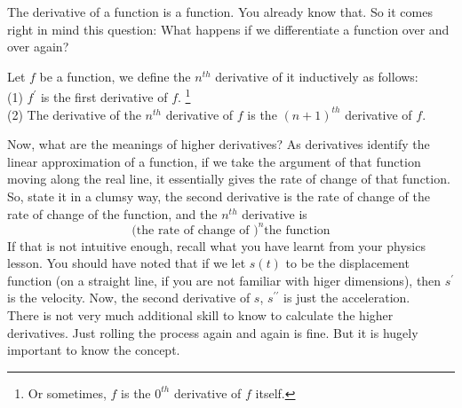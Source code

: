 The derivative of a function is a function.
You already know that.
So it comes right in mind this question:
What happens if we differentiate a function over and over again?
\begin{definition}
    Let $f$ be a function, we define the $n^{th}$ derivative of it inductively as follows:\\
    (1) $f^\prime$ is the first derivative of $f$.
    \footnote{Or sometimes, $f$ is the $0^{th}$ derivative of $f$ itself.}
    \\
    (2) The derivative of the $n^{th}$ derivative of $f$ is the $(n+1)^{th}$ derivative of $f$.
\end{definition}
Now, what are the meanings of higher derivatives?
As derivatives identify the linear approximation of a function, if we take the argument of that function moving along the real line, it essentially gives the rate of change of that function.
So, state it in a clumsy way, the second derivative is the rate of change of the rate of change of the function, and the $n^{th}$ derivative is
$$\text{(the rate of change of )}^n\text{the function}$$
If that is not intuitive enough, recall what you have learnt from your physics lesson.
You should have noted that if we let $s(t)$ to be the displacement function (on a straight line, if you are not familiar with higer dimensions), then $s^\prime$ is the velocity.
Now, the second derivative of $s$, $s^{\prime\prime}$ is just the acceleration.\\
There is not very much additional skill to know to calculate the higher derivatives.
Just rolling the process again and again is fine.
But it is hugely important to know the concept.